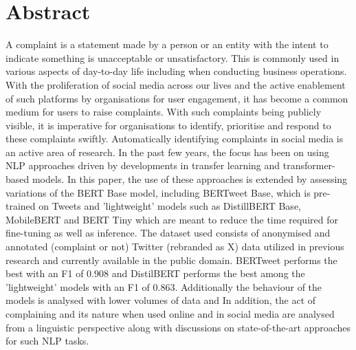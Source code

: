 \chapter*{\Large \center Abstract}

A complaint is a statement made by a person or an entity with the intent to indicate something is unacceptable or unsatisfactory. This is commonly used in various aspects of day-to-day life including when conducting business operations. With the proliferation of social media across our lives and the active enablement of such platforms by organisations for user engagement, it has become a common medium for users to raise complaints. With such complaints being publicly visible, it is imperative for organisations to identify, prioritise and respond to these complaints swiftly. Automatically identifying complaints in social media is an active area of research. In the past few years, the focus has been on using NLP approaches driven by developments in transfer learning and transformer-based models.
\newline \newline
In this paper, the use of these approaches is extended by assessing variations of the BERT Base model, including BERTweet Base, which is pre-trained on Tweets and 'lightweight' models such as DistillBERT Base, MobileBERT and BERT Tiny which are meant to reduce the time required for fine-tuning as well as inference. The dataset used consists of anonymised and annotated (complaint or not) Twitter (rebranded as X) data utilized in previous research and currently available in the public domain. BERTweet performs the best with an F1 of 0.908 and DistilBERT performs the best among the 'lightweight' models with an F1 of 0.863. Additionally the behaviour of the models is analysed with lower volumes of data and  In addition, the act of complaining and its nature when used online and in social media are analysed from a linguistic perspective along with discussions on state-of-the-art approaches for such NLP tasks.
\newline \newline
